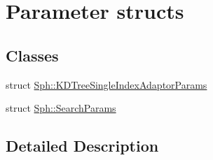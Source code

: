 \hypertarget{group__param__grp}{}\section{Parameter structs}
\label{group__param__grp}
\subsection*{Classes}
\begin{DoxyCompactItemize}
\item 
struct \hyperlink{structSph_1_1KDTreeSingleIndexAdaptorParams}{Sph\+::\+K\+D\+Tree\+Single\+Index\+Adaptor\+Params}
\item 
struct \hyperlink{structSph_1_1SearchParams}{Sph\+::\+Search\+Params}
\end{DoxyCompactItemize}


\subsection{Detailed Description}
